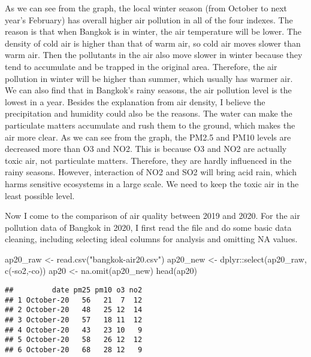 \documentclass[
]{article}
\newenvironment{Shaded}{\begin{snugshade}}{\end{snugshade}}
\newcommand{\FunctionTok}[1]{\textcolor[rgb]{0.00,0.00,0.00}{#1}}
\newcommand{\NormalTok}[1]{#1}
\newcommand{\OtherTok}[1]{\textcolor[rgb]{0.56,0.35,0.01}{#1}}
\newcommand{\SpecialCharTok}[1]{\textcolor[rgb]{0.00,0.00,0.00}{#1}}
\newcommand{\StringTok}[1]{\textcolor[rgb]{0.31,0.60,0.02}{#1}}
\begin{document}
As we can see from the graph, the local winter season (from October to
next year's February) has overall higher air pollution in all of the
four indexes. The reason is that when Bangkok is in winter, the air
temperature will be lower. The density of cold air is higher than that
of warm air, so cold air moves slower than warm air. Then the pollutants
in the air also move slower in winter because they tend to accumulate
and be trapped in the original area. Therefore, the air pollution in
winter will be higher than summer, which usually has warmer air. We can
also find that in Bangkok's rainy seasons, the air pollution level is
the lowest in a year. Besides the explanation from air density, I
believe the precipitation and humidity could also be the reasons. The
water can make the particulate matters accumulate and rush them to the
ground, which makes the air more clear. As we can see from the graph,
the PM2.5 and PM10 levels are decreased more than O3 and NO2. This is
because O3 and NO2 are actually toxic air, not particulate matters.
Therefore, they are hardly influenced in the rainy seasons. However,
interaction of NO2 and SO2 will bring acid rain, which harms sensitive
ecosystems in a large scale. We need to keep the toxic air in the least
possible level.

Now I come to the comparison of air quality between 2019 and 2020. For
the air pollution data of Bangkok in 2020, I first read the file and do
some basic data cleaning, including selecting ideal columns for analysis
and omitting NA values.

\begin{Shaded}
\begin{Highlighting}[]
\NormalTok{ap20\_raw }\OtherTok{\textless{}{-}} \FunctionTok{read.csv}\NormalTok{(}\StringTok{"bangkok{-}air20.csv"}\NormalTok{)}
\NormalTok{ap20\_new }\OtherTok{\textless{}{-}}\NormalTok{ dplyr}\SpecialCharTok{::}\FunctionTok{select}\NormalTok{(ap20\_raw, }\FunctionTok{c}\NormalTok{(}\SpecialCharTok{{-}}\NormalTok{so2,}\SpecialCharTok{{-}}\NormalTok{co))}
\NormalTok{ap20 }\OtherTok{\textless{}{-}} \FunctionTok{na.omit}\NormalTok{(ap20\_new)}
\FunctionTok{head}\NormalTok{(ap20)}
\end{Highlighting}
\end{Shaded}

\begin{verbatim}
##         date pm25 pm10 o3 no2
## 1 October-20   56   21  7  12
## 2 October-20   48   25 12  14
## 3 October-20   57   18 11  12
## 4 October-20   43   23 10   9
## 5 October-20   58   26 12  12
## 6 October-20   68   28 12   9
\end{verbatim}
\end{document}
